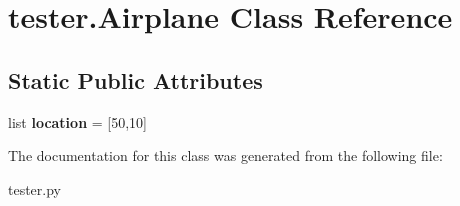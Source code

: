 \hypertarget{classtester_1_1_airplane}{}\section{tester.\+Airplane Class Reference}
\label{classtester_1_1_airplane}
\subsection*{Static Public Attributes}
\begin{DoxyCompactItemize}
\item 
\mbox{\label{classtester_1_1_airplane_ada53510c7aab8566b97b0e1774cdc321}} 
list {\bfseries location} = \mbox{[}50,10\mbox{]}
\end{DoxyCompactItemize}


The documentation for this class was generated from the following file\+:\begin{DoxyCompactItemize}
\item 
tester.\+py\end{DoxyCompactItemize}
